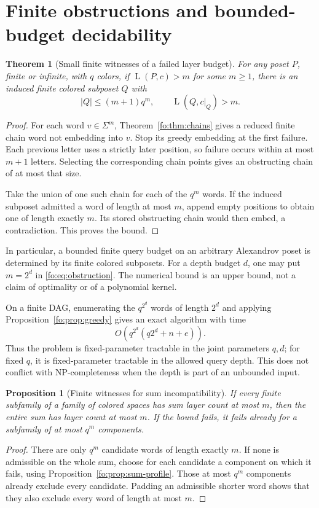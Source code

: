 \documentclass[11pt,letterpaper]{article}
\numberwithin{equation}{section}
\newtheorem{theorem}{Theorem}[section]
\newtheorem{proposition}[proposition]{Proposition}
\theoremstyle{definition}
\theoremstyle{remark}
\theoremstyle{definition}
\newcommand{\layers}{\operatorname{L}}
\newcommand{\len}[1]{\lvert #1\rvert}
\begin{document}
\section{Finite obstructions and bounded-budget decidability}
\label{fo:sec:obstructions}

\begin{theorem}[Small finite witnesses of a failed layer budget]
\label{fo:thm:obstruction}
For any poset $P$, finite or infinite, with $q$ colors, if
$\layers(P,c)>m$ for some $m\ge1$, there is an induced finite colored subposet
$Q$ with
\begin{equation}\label{fo:eq:obstruction}
 \len{Q}\le(m+1)q^m,\qquad \layers(Q,c|_Q)>m.
\end{equation}
\end{theorem}
\begin{proof}
For each word $v\in\Sigma^m$, Theorem~\ref{fo:thm:chains} gives a reduced finite
chain word not embedding into $v$. Stop its greedy embedding at the first
failure. Each previous letter uses a strictly later position, so failure occurs
within at most $m+1$ letters. Selecting the corresponding chain points gives an
obstructing chain of at most that size.

Take the union of one such chain for each of the $q^m$ words. If the induced
subposet admitted a word of length at most $m$, append empty positions to obtain
one of length exactly $m$. Its stored obstructing chain would then embed,
a contradiction. This proves the bound.
\end{proof}

In particular, a bounded finite query budget on an arbitrary Alexandrov poset
is determined by its finite colored subposets. For a depth budget $d$, one may
put $m=2^d$ in \eqref{fo:eq:obstruction}. The numerical bound is an upper bound,
not a claim of optimality or of a polynomial kernel.

On a finite DAG, enumerating the $q^{2^d}$ words of length $2^d$ and applying
Proposition~\ref{fo:prop:greedy} gives an exact algorithm with time
\[
 O\!\left(q^{2^d}(q2^d+n+e)\right).
\]
Thus the problem is fixed-parameter tractable in the joint parameters $q,d$;
for fixed $q$, it is fixed-parameter tractable in the allowed query depth.
This does not conflict with NP-completeness when the depth is part of an
unbounded input.

\begin{proposition}[Finite witnesses for sum incompatibility]
If every finite subfamily of a family of colored spaces has sum layer count
at most $m$, then the entire sum has layer count at most $m$. If the bound fails,
it fails already for a subfamily of at most $q^m$ components.
\end{proposition}
\begin{proof}
There are only $q^m$ candidate words of length exactly $m$. If none is admissible
on the whole sum, choose for each candidate a component on which it fails,
using Proposition~\ref{fo:prop:sum-profile}. Those at most $q^m$ components already
exclude every candidate. Padding an admissible shorter word shows that they
also exclude every word of length at most $m$.
\end{proof}
\end{document}
